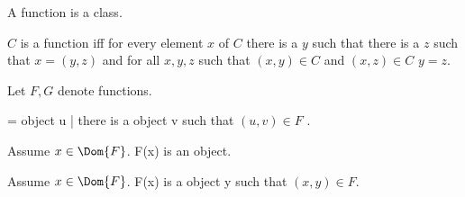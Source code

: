 \documentclass{article}
\begin{document}
\begin{forthel}
    \begin{signature}
      A function is a class.
    \end{signature}

    \begin{axiom}[RelationIntro]
      $C$ is a function iff for every element $x$ of $C$
          there is a $y$ such that there is a $z$ such that $x = (y, z)$
          and for all $x, y, z$ such that $(x, y) \in C$ and $(x, z) \in C$ $y = z$.
    \end{axiom}

    Let $F, G$ denote functions.

    \begin{definition} 
       = { object u | there is a object v such that $(u, v) \in F$ }.
    \end{definition}

    \begin{signature}
      Assume $x \in \Dom{F}$.
      F(x) is an object.
    \end{signature}

    \begin{axiom}
      Assume $x \in \Dom{F}$.
      F(x) is a object y such that $(x, y) \in F$.
    \end{axiom}
  \end{forthel}
\end{document}
